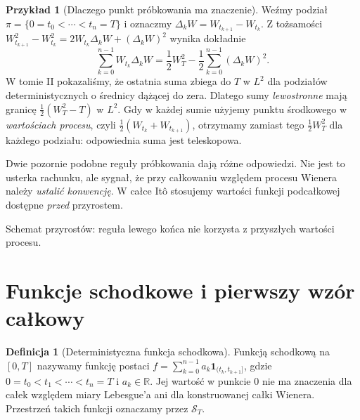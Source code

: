 \documentclass[11pt,a4paper,oneside]{report}
\numberwithin{equation}{chapter}
\theoremstyle{plain}
\theoremstyle{definition}
\newtheorem{definicja}{Definicja}[chapter]
\newtheorem{przyklad}{Przykład}[chapter]
\theoremstyle{remark}
\newcommand{\R}{\mathbb{R}}
\newcommand{\calS}{\mathcal{S}}
\newcommand{\ind}[1]{\mathbf{1}_{#1}}
\begin{document}
\begin{przyklad}[Dlaczego punkt próbkowania ma znaczenie]
Weźmy podział $\pi=\{0=t_0<\cdots<t_n=T\}$ i oznaczmy
$\Delta_kW=W_{t_{k+1}}-W_{t_k}$. Z tożsamości
$W_{t_{k+1}}^2-W_{t_k}^2=2W_{t_k}\Delta_kW+(\Delta_kW)^2$
wynika dokładnie
\[
\sum_{k=0}^{n-1}W_{t_k}\Delta_kW
=\frac12W_T^2-\frac12\sum_{k=0}^{n-1}(\Delta_kW)^2.
\]
W tomie II pokazaliśmy, że ostatnia suma zbiega do $T$ w $L^2$
dla podziałów deterministycznych o średnicy dążącej do zera.
Dlatego sumy \emph{lewostronne} mają granicę
$\frac12(W_T^2-T)$ w $L^2$. Gdy w każdej sumie użyjemy
punktu środkowego w \emph{wartościach procesu}, czyli
$\frac12(W_{t_k}+W_{t_{k+1}})$, otrzymamy zamiast tego
$\frac12W_T^2$ dla każdego podziału: odpowiednia suma
jest teleskopowa.

Dwie pozornie podobne reguły próbkowania dają różne odpowiedzi.
Nie jest to usterka rachunku, ale sygnał, że przy całkowaniu względem
procesu Wienera należy \emph{ustalić konwencję}. W całce Itô
stosujemy wartości funkcji podcałkowej dostępne \emph{przed} przyrostem.
\end{przyklad}

\begin{center}
\par\smallskip\small Schemat przyrostów: reguła lewego końca nie korzysta z przyszłych wartości procesu.
\end{center}

\section{Funkcje schodkowe i pierwszy wzór całkowy}
\begin{definicja}[Deterministyczna funkcja schodkowa]
Funkcją schodkową na $[0,T]$ nazywamy funkcję postaci
$f=\sum_{k=0}^{n-1}a_k\ind{(t_k,t_{k+1}]}$, gdzie
$0=t_0<t_1<\cdots<t_n=T$ i $a_k\in\R$.
Jej wartość w punkcie $0$ nie ma znaczenia dla całek względem
miary Lebesgue'a ani dla konstruowanej całki Wienera.
Przestrzeń takich funkcji oznaczamy przez $\calS_T$.
\end{definicja}
\end{document}
